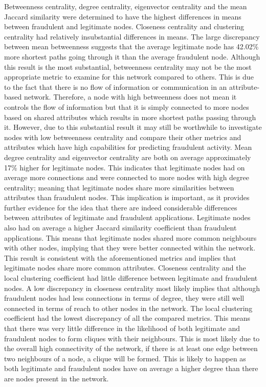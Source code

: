 \documentclass{styles/svproc}
\begin{document}
Betweenness centrality, degree centrality, eigenvector centrality and the mean Jaccard similarity were determined to have the highest differences in means between fraudulent and legitimate nodes. Closeness centrality and clustering centrality had relatively insubstantial differences in means. 
The large discrepancy between mean betweenness suggests that the average legitimate node has 42.02\% more shortest paths going through it than the average fraudulent node. Although this result is the most substantial, betweenness centrality may not be the most appropriate metric to examine for this network compared to others. This is due to the fact that there is no flow of information or communication in an attribute-based network. Therefore, a node with high betweenness does not mean it controls the flow of information but that it is simply connected to more nodes based on shared attributes which results in more shortest paths passing through it. However, due to this substantial result it may still be worthwhile to investigate nodes with low betweenness centrality and compare their other metrics and attributes which have high capabilities for predicting fraudulent activity.
Mean degree centrality and eigenvector centrality are both on average approximately 17\% higher for legitimate nodes. This indicates that legitimate nodes had on average more connections and were connected to more nodes with high degree centrality; meaning that legitimate nodes share more similarities between attributes than fraudulent nodes. This implication is important, as it provides further evidence for the idea that there are indeed considerable differences between attributes of legitimate and fraudulent applications.
Legitimate nodes also had on average a higher Jaccard similarity coefficient than fraudulent applications. This means that legitimate nodes shared more common neighbours with other nodes, implying that they were better connected within the network. This result is consistent with the aforementioned metrics and implies that legitimate nodes share more common attributes.
Closeness centrality and the local clustering coefficient had little difference between legitimate and fraudulent nodes. A low discrepancy in closeness centrality most likely implies that although fraudulent nodes had less connections in terms of degree, they were still well connected in terms of reach to other nodes in the network. The local clustering coefficient had the lowest discrepancy of all the compared metrics. This means that there was very little difference in the likelihood of both legitimate and fraudulent nodes to form cliques with their neighbours. This is most likely due to the overall high connectivity of the network, if there is at least one edge between two neighbours of a node, a clique will be formed. This is likely to happen as both legitimate and fraudulent nodes have on average a higher degree than there are nodes present in the network.
\end{document}
